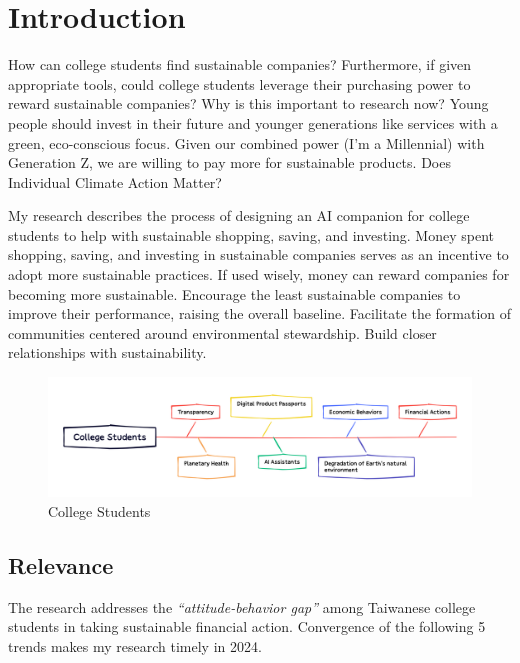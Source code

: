 \documentclass[
  12pt,
  letterpaper,
  DIV=11,
  numbers=noendperiod]{scrartcl}
\begin{document}
\newpage

\section{Introduction}\label{introduction}

How can college students find sustainable companies? Furthermore, if
given appropriate tools, could college students leverage their
purchasing power to reward sustainable companies? Why is this important
to research now? Young people should invest in their future and younger
generations like services with a green, eco-conscious focus. Given our
combined power (I'm a Millennial) with Generation Z, we are willing to
pay more for sustainable products. Does Individual Climate Action
Matter?

My research describes the process of designing an AI companion for
college students to help with sustainable shopping, saving, and
investing. Money spent shopping, saving, and investing in sustainable
companies serves as an incentive to adopt more sustainable practices. If
used wisely, money can reward companies for becoming more sustainable.
Encourage the least sustainable companies to improve their performance,
raising the overall baseline. Facilitate the formation of communities
centered around environmental stewardship. Build closer relationships
with sustainability.

\begin{figure}[H]

{\centering \includegraphics[width=1\linewidth,height=\textheight,keepaspectratio]{./images/introduction/abstract.png}

}

\caption{College Students}

\end{figure}%

\subsection{Relevance}\label{relevance}

The research addresses the \emph{``attitude-behavior gap''} among
Taiwanese college students in taking sustainable financial action.
Convergence of the following 5 trends makes my research timely in 2024.
\end{document}
